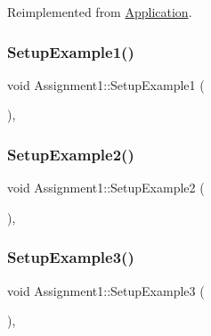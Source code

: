 Reimplemented from \hyperlink{class_application_ae6074c3f102de1cb2fe4c81b545679db}{Application}.

\hypertarget{class_assignment1_a07743a6d86f7603dd58339c4db1de192}{}\label{class_assignment1_a07743a6d86f7603dd58339c4db1de192} 
\subsubsection{\texorpdfstring{Setup\+Example1()}{SetupExample1()}}
{\footnotesize\ttfamily void Assignment1\+::\+Setup\+Example1 (\begin{DoxyParamCaption}{ }\end{DoxyParamCaption})\hspace{0.3cm}{\ttfamily [private]}, {\ttfamily [virtual]}}

\hypertarget{class_assignment1_aeabed7b579d59a6fdacaeab468afba29}{}\label{class_assignment1_aeabed7b579d59a6fdacaeab468afba29} 
\subsubsection{\texorpdfstring{Setup\+Example2()}{SetupExample2()}}
{\footnotesize\ttfamily void Assignment1\+::\+Setup\+Example2 (\begin{DoxyParamCaption}{ }\end{DoxyParamCaption})\hspace{0.3cm}{\ttfamily [private]}, {\ttfamily [virtual]}}

\hypertarget{class_assignment1_afbb3cb7765b899e69c9847d29f045392}{}\label{class_assignment1_afbb3cb7765b899e69c9847d29f045392} 
\subsubsection{\texorpdfstring{Setup\+Example3()}{SetupExample3()}}
{\footnotesize\ttfamily void Assignment1\+::\+Setup\+Example3 (\begin{DoxyParamCaption}{ }\end{DoxyParamCaption})\hspace{0.3cm}{\ttfamily [private]}, {\ttfamily [virtual]}}

